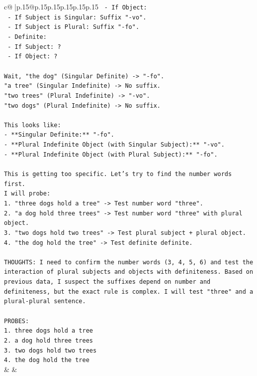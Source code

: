 \documentclass{article}
\begin{document}
{\begin{supertabular}{c@{$\;$}|p{.15\linewidth}@{}p{.15\linewidth}p{.15\linewidth}p{.15\linewidth}p{.15\linewidth}p{.15\linewidth}}
{{{\texttt{    {-} If Object:} \\
\texttt{      {-} If Subject is Singular: Suffix "{-}vo".} \\
\texttt{      {-} If Subject is Plural: Suffix "{-}fo".} \\
\texttt{  {-} Definite:} \\
\texttt{    {-} If Subject: ?} \\
\texttt{    {-} If Object: ?} \\
\\ 
\texttt{Wait, "the dog" (Singular Definite) {-}> "{-}fo".} \\
\texttt{"a tree" (Singular Indefinite) {-}> No suffix.} \\
\texttt{"two trees" (Plural Indefinite) {-}> "{-}vo".} \\
\texttt{"two dogs" (Plural Indefinite) {-}> No suffix.} \\
\\ 
\texttt{This looks like:} \\
\texttt{{-} **Singular Definite:** "{-}fo".} \\
\texttt{{-} **Plural Indefinite Object (with Singular Subject):** "{-}vo".} \\
\texttt{{-} **Plural Indefinite Object (with Plural Subject):** "{-}fo".} \\
\\ 
\texttt{This is getting too specific. Let's try to find the number words first.} \\
\texttt{I will probe:} \\
\texttt{1.  "three dogs hold a tree" {-}> Test number word "three".} \\
\texttt{2.  "a dog hold three trees" {-}> Test number word "three" with plural object.} \\
\texttt{3.  "two dogs hold two trees" {-}> Test plural subject + plural object.} \\
\texttt{4.  "the dog hold the tree" {-}> Test definite definite.} \\
\\ 
\texttt{THOUGHTS: I need to confirm the number words (3, 4, 5, 6) and test the interaction of plural subjects and objects with definiteness. Based on previous data, I suspect the suffixes depend on number and definiteness, but the exact rule is complex. I will test "three" and a plural{-}plural sentence.} \\
\\ 
\texttt{PROBES:} \\
\texttt{1. three dogs hold a tree} \\
\texttt{2. a dog hold three trees} \\
\texttt{3. two dogs hold two trees} \\
\texttt{4. the dog hold the tree} \\
            }
        }
    }
    & & \\ \\


\end{supertabular}}
\end{document}
